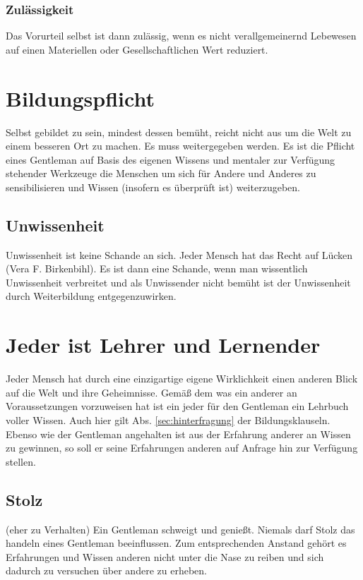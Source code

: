             \subsubsection{Zulässigkeit}
                Das Vorurteil selbst ist dann zulässig, wenn es nicht verallgemeinernd Lebewesen auf einen Materiellen oder Gesellschaftlichen Wert reduziert.

    \section{Bildungspflicht}
        Selbst gebildet zu sein, mindest dessen bemüht, reicht nicht aus um die Welt zu einem besseren Ort zu machen. 
        Es muss weitergegeben werden. 
        Es ist die Pflicht eines Gentleman auf Basis des eigenen Wissens und mentaler zur Verfügung stehender Werkzeuge die Menschen um sich für Andere und Anderes zu sensibilisieren und Wissen (insofern es überprüft ist) weiterzugeben.

        \subsection{Unwissenheit}
            Unwissenheit ist keine Schande an sich. \glqq Jeder Mensch hat das Recht auf Lücken\grqq \\  (Vera F. Birkenbihl). Es ist dann eine Schande, wenn man wissentlich Unwissenheit verbreitet und als Unwissender nicht bemüht ist der Unwissenheit durch Weiterbildung entgegenzuwirken.

    \section{Jeder ist Lehrer und Lernender}
        Jeder Mensch hat durch eine einzigartige eigene Wirklichkeit einen anderen Blick auf die Welt und ihre Geheimnisse. Gemäß dem was ein anderer an Voraussetzungen vorzuweisen hat ist ein jeder für den Gentleman ein Lehrbuch voller Wissen. Auch hier gilt Abs. \ref{sec:hinterfragung} der Bildungsklauseln. 
        Ebenso wie der Gentleman angehalten ist aus der Erfahrung anderer an Wissen zu gewinnen, so soll er seine Erfahrungen anderen auf Anfrage hin zur Verfügung stellen.

        \subsection{Stolz} {\color{red}(eher zu Verhalten)}
        Ein Gentleman schweigt und genießt. Niemals darf Stolz das handeln eines Gentleman beeinflussen. Zum entsprechenden Anstand gehört es Erfahrungen und Wissen anderen nicht unter die Nase zu reiben und sich dadurch zu versuchen über andere zu erheben.
